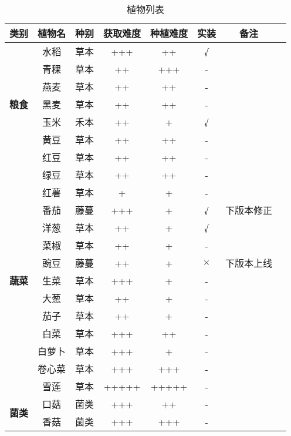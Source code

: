 \begin{center}
    \setlength{\tabcolsep}{4mm}
    \begin{longtable}{c|cc|ccccc}
        \caption{植物列表} \\
        \toprule
        \textbf{类别} &\textbf{植物名} &  \textbf{种别} & \textbf{获取难度}  & \textbf{种植难度}  & \textbf{实装} & \textbf{备注} \\
        \midrule
        \multirow{7}{*}{\textbf{粮食}}& 水稻   & 草本  & +++    & ++ & √ &         \\
        & 青稞 & 草本 & ++ & +++ & - & \\
        & 燕麦 & 草本 & ++ & ++ & - & \\
        & 黑麦 & 草本 & ++ & ++ & - & \\
        & 玉米   & 禾本  & ++    & + & √ &         \\
        & 黄豆   & 草本  & ++    & ++ & - &         \\
        & 红豆   & 草本  & ++    & ++ & - &         \\
        & 绿豆   & 草本  & ++    & ++ & - &         \\
        & 红薯   & 草本  & +    & + & - &         \\
        \midrule
        \multirow{9}{*}{\textbf{蔬菜}}& 番茄   & 藤蔓  & +++    & + &  √ &  下版本修正  \\
        & 洋葱   & 草本  & ++    & + & √ &         \\
        & 菜椒   & 草本  & ++    & + & -  &        \\
        & 豌豆   & 藤蔓  & ++    & + & $\times$ &  下版本上线  \\
        & 生菜   & 草本  & +++   & + & - &        \\
        & 大葱   & 草本  & ++    & + & - &        \\
        & 茄子   & 草本  & ++    & + & - &        \\
        & 白菜   & 草本  & +++    & ++ & - &      \\
        & 白萝卜   & 草本  & +++ & + & - &        \\
        & 卷心菜   & 草本  & +++    & +++ & - &        \\
        & 雪莲   & 草本  & +++++    & +++++ & - &         \\
        \midrule
        \multirow{6}{*}{\textbf{菌类}}& 口菇   & 菌类  & +++    & ++ & - &   \\
        & 香菇   & 菌类  & +++    & +++ & - &        \\

\end{longtable}
\end{center}

